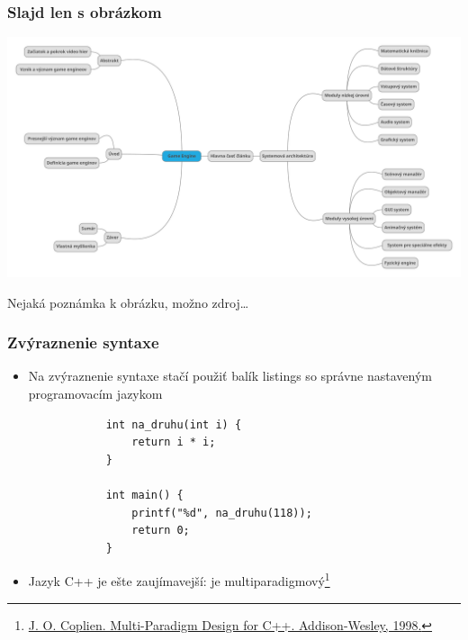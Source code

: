 \documentclass{beamer}
\newcommand{\footcite}[1]{\footnote{\tiny #1}}
\begin{document}
\begin{frame}[fragile=singleslide]\frametitle{Slajd len s obrázkom}
	\includegraphics[scale=0.12]{diagram.pdf}
	
	{\tiny Nejaká poznámka k obrázku, možno zdroj\ldots}
\end{frame}


\begin{frame}[fragile=singleslide]\frametitle{Zvýraznenie syntaxe}
	\begin{itemize}
		\item Na zvýraznenie syntaxe stačí použiť balík listings so správne nastaveným programovacím jazykom
		\begin{lstlisting}
			int na_druhu(int i) {
				return i * i;
			}
			
			int main() {
				printf("%d", na_druhu(118));
				return 0;
			}
		\end{lstlisting}
		
		\item Jazyk C++ je ešte zaujímavejší: je multiparadigmový\footcite{\url{J. O. Coplien. Multi-Paradigm Design for C++. Addison-Wesley, 1998.}}
	\end{itemize}
\end{frame}
\end{document}
